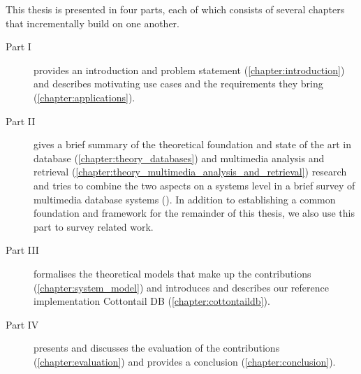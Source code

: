 This thesis is presented in four parts, each of which consists of several chapters that incrementally build on one another.

\begin{description}
    \item[Part I] provides an introduction and problem statement (\cref{chapter:introduction}) and describes motivating use cases and the requirements they bring (\cref{chapter:applications}).
    \item[Part II] gives a brief summary of the theoretical foundation and state of the art in database (\cref{chapter:theory_databases}) and multimedia analysis and retrieval (\cref{chapter:theory_multimedia_analysis_and_retrieval}) research and tries to combine the two aspects on a systems level in a brief survey of multimedia database systems (). In addition to establishing a common foundation and framework for the remainder of this thesis, we also use this part to survey related work.
    \item[Part III] formalises the theoretical models that make up the contributions (\cref{chapter:system_model}) and introduces and describes our reference implementation Cottontail DB (\cref{chapter:cottontaildb}).
    \item[Part IV] presents and discusses the evaluation of the contributions (\cref{chapter:evaluation}) and provides a conclusion (\cref{chapter:conclusion}).
\end{description}